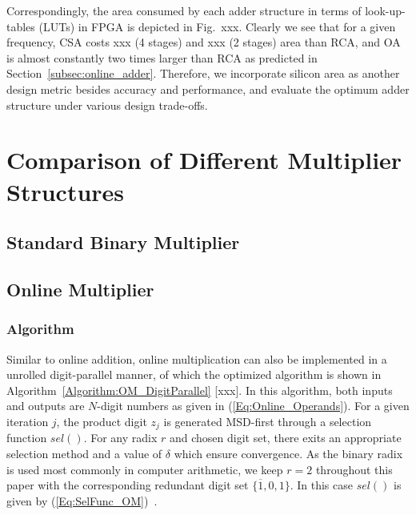 \documentclass[10pt, conference, compsocconf]{IEEEtran}
\begin{document}
Correspondingly, the area consumed by each adder structure in terms of look-up-tables (LUTs) in FPGA is depicted in Fig.~xxx. Clearly we see that for a given frequency, CSA costs xxx (4 stages) and xxx (2 stages) area than RCA, and OA is almost constantly two times larger than RCA as predicted in Section~\ref{subsec:online_adder}. Therefore, we incorporate silicon area as another design metric besides accuracy and performance, and evaluate the optimum adder structure under various design trade-offs.


\section{Comparison of Different Multiplier Structures}
\subsection{Standard Binary Multiplier}

\subsection{Online Multiplier}
\subsubsection{Algorithm}
Similar to online addition, online multiplication can also be implemented in a unrolled digit-parallel manner, of which the optimized algorithm is shown in Algorithm~\ref{Algorithm:OM_DigitParallel} [xxx]. In this algorithm, both inputs and outputs are $N$-digit numbers as given in (\ref{Eq:Online_Operands}). For a given iteration $j$, the product digit $z_j$ is generated MSD-first through a selection function $sel()$. For any radix $r$ and chosen digit set, there exits an appropriate selection method and a value of $\delta$ which ensure convergence. As the binary radix is used most commonly in computer arithmetic, we keep $r=2$ throughout this paper with the corresponding redundant digit set $\{\overline{1},0,1\}$. In this case $sel()$ is given by (\ref{Eq:SelFunc_OM})~\cite{Ercegovac_OnlineMult}.
\end{document}
